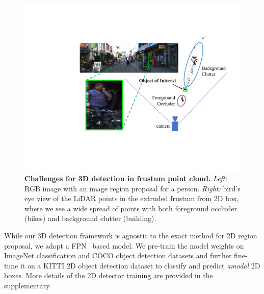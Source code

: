 \begin{figure}[b!]
    \centering
    \includegraphics[width=0.8\linewidth]{fig/frustum_challenge.pdf}
    \caption{\textbf{Challenges for 3D detection in frustum point cloud.} \emph{Left:} RGB image with an image region proposal for a person. \emph{Right:} bird's eye view of the LiDAR points in the extruded frustum from 2D box, where we see a wide spread of points with both foreground occluder (bikes) and background clutter (building).}
    \label{fig:frustum}
\end{figure}



While our 3D detection framework is agnostic to the exact method for 2D region proposal, we adopt a FPN~\cite{lin2016feature} based model. We pre-train the model weights on ImageNet classification and COCO object detection datasets and further fine-tune it on a KITTI 2D object detection dataset to classify and predict \emph{amodal} 2D boxes. More details of the 2D detector training are provided in the supplementary.


